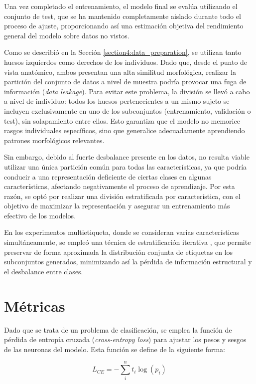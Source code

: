 Una vez completado el entrenamiento, el modelo final se evalúa utilizando el conjunto de test, que se ha mantenido completamente aislado durante todo el proceso de ajuste, proporcionando así una estimación objetiva del rendimiento general del modelo sobre datos no vistos.

Como se describió en la Sección \ref{section4:data_preparation}, se utilizan tanto huesos izquierdos como derechos de los individuos. Dado que, desde el punto de vista anatómico, ambos presentan una alta similitud morfológica, realizar la partición del conjunto de datos a nivel de muestra podría provocar una fuga de información (\textit{data leakage}). Para evitar este problema, la división se llevó a cabo a nivel de individuo: todos los huesos pertenecientes a un mismo sujeto se incluyen exclusivamente en uno de los subconjuntos (entrenamiento, validación o test), sin solapamiento entre ellos. Esto garantiza que el modelo no memorice rasgos individuales específicos, sino que generalice adecuadamente aprendiendo patrones morfológicos relevantes.

Sin embargo, debido al fuerte desbalance presente en los datos, no resulta viable utilizar una única partición común para todas las características, ya que podría conducir a una representación deficiente de ciertas clases en algunas características, afectando negativamente el proceso de aprendizaje. Por esta razón, se optó por realizar una división estratificada por característica, con el objetivo de maximizar la representación y asegurar un entrenamiento más efectivo de los modelos.

En los experimentos multietiqueta, donde se consideran varias características simultáneamente, se empleó una técnica de estratificación iterativa \cite{sechidis2011stratification, pmlr-v74-szymański17a}, que permite preservar de forma aproximada la distribución conjunta de etiquetas en los subconjuntos generados, minimizando así la pérdida de información estructural y el desbalance entre clases.

\section{Métricas}
\label{section5:metrics}
Dado que se trata de un problema de clasificación, se emplea la función de pérdida de entropía cruzada (\textit{cross-entropy loss}) para ajustar los pesos y sesgos de las neuronas del modelo. Esta función se define de la siguiente forma:

\begin{equation}
L_{CE} = -\sum_i^n t_i \log(p_i)
\end{equation}

